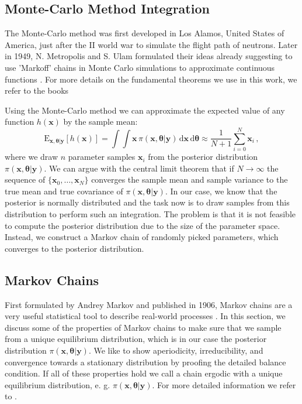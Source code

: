 \subsection{Monte-Carlo Method Integration}
The Monte-Carlo method was first developed in Los Alamos, United States of America, just after the II world war to simulate the flight path of neutrons.
Later in 1949, N. Metropolis and S. Ulam formulated their ideas already suggesting to use 'Markoff' chains in Monte Carlo simulations to approximate continuous functions \cite{metropolis1949monte}.
For more details on the fundamental theorems we use in this work, we refer to the books \cite{hammersley1964general, whitlock1986monte}

Using the Monte-Carlo method we can approximate the expected value of any function $h(\bm{x})$ by the sample mean:
\begin{equation}
\label{eq:sampMean}
    \text{E}_{\bm{x},\bm{\theta}|\bm{y}} [h(\bm{x})] =  \int \int   \bm{x} \,  \pi(\bm{x}, \bm{\theta} | \bm{y} ) \, \text{d} \bm{x}  \, \text{d} \bm{\theta} \approx \frac{1}{N +1} \sum_{i=0}^{N} \bm{x}_{i} \, ,
\end{equation}
where we draw $n$ parameter samples $\bm{x}_{i}$ from the posterior distribution $\pi (\bm{x} , \bm{\theta} | \bm{y})$.
We can argue with the central limit theorem that if $N \rightarrow \infty$ the sequence of $ \{ \bm{x}_{0}, \dots, \bm{x}_{N} \}$ converges the sample mean and sample variance to the true mean and true covariance of $\pi( \bm{x}, \bm{\theta} | \bm{y})$.
In our case, we know that the posterior is normally distributed and the task now is to draw samples from this distribution to perform such an integration.
The problem is that it is not feasible to compute the posterior distribution due to the size of the parameter space.
Instead, we construct a Markov chain of randomly picked parameters, which converges to the posterior distribution.

\subsection{Markov Chains}
\label{subsec:Markov}
First formulated by Andrey Markov and published in 1906, Markov chains are a very useful statistical tool to describe real-world processes \cite{markov2006extension}. 
In this section, we discuss some of the properties of Markov chains to make sure that we sample from a unique equilibrium distribution, which is in our case the posterior distribution $\pi (\bm{x} , \bm{\theta} | \bm{y})$.
We like to show aperiodicity, irreducibility, and convergence towards a stationary distribution by proofing the detailed balance condition.
If all of these properties hold we call a chain ergodic with a unique equilibrium distribution, e. g. $\pi (\bm{x} , \bm{\theta} | \bm{y})$.
For more detailed information we refer to \cite{fox2010introduction, bremaud2013markov}.

